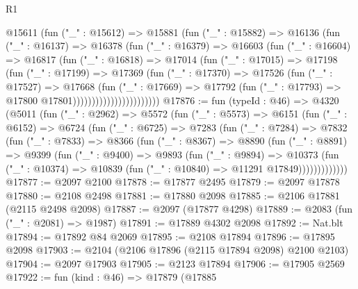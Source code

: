 \begin{lexlean}{R1}
\begin{coremodule}
                        @15611
                          (fun ("_" : @15612) =>
                          @15881
                            (fun ("_" : @15882) =>
                            @16136
                              (fun ("_" : @16137) =>
                              @16378
                                (fun ("_" : @16379) =>
                                @16603
                                  (fun ("_" : @16604) =>
                                  @16817
                                    (fun ("_" : @16818) =>
                                    @17014
                                      (fun ("_" : @17015) =>
                                      @17198
                                        (fun ("_" : @17199) =>
                                        @17369
                                          (fun ("_" : @17370) =>
                                          @17526
                                            (fun ("_" : @17527) =>
                                            @17668
                                              (fun ("_" : @17669) =>
                                              @17792
                                                (fun ("_" : @17793) =>
                                                @17800 @17801)))))))))))))))))))))))
@17876 := fun (typeId : @46) =>
  @4320
    (@5011
      (fun ("_" : @2962) =>
      @5572
        (fun ("_" : @5573) =>
        @6151
          (fun ("_" : @6152) =>
          @6724
            (fun ("_" : @6725) =>
            @7283
              (fun ("_" : @7284) =>
              @7832
                (fun ("_" : @7833) =>
                @8366
                  (fun ("_" : @8367) =>
                  @8890
                    (fun ("_" : @8891) =>
                    @9399
                      (fun ("_" : @9400) =>
                      @9893
                        (fun ("_" : @9894) =>
                        @10373
                          (fun ("_" : @10374) =>
                          @10839 (fun ("_" : @10840) => @11291 @17849)))))))))))))
@17877 := @2097 @2100
@17878 := @17877 @2495
@17879 := @2097 @17878
@17880 := @2108 @2498
@17881 := @17880 @2098
@17885 := @2106 @17881 (@2115 @2498 @2098)
@17887 := @2097 (@17877 @4298)
@17889 := @2083 (fun ("_" : @2081) => @1987)
@17891 := @17889 @4302 @2098
@17892 := Nat.blt
@17894 := @17892 @84 @2069
@17895 := @2108 @17894
@17896 := @17895 @2098
@17903 := @2104 (@2106 @17896 (@2115 @17894 @2098) @2100 @2103)
@17904 := @2097 @17903
@17905 := @2123 @17894
@17906 := @17905 @2569
@17922 := fun (kind : @46) =>
  @17879
    (@17885

\end{coremodule}
\end{lexlean}
